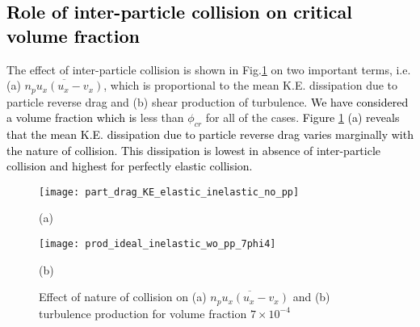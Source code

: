 \documentclass[aip,graphicx]{revtex4-1}
\begin{document}
\subsection{\textcolor{black}{Role of inter-particle collision on critical volume fraction}}
The effect of inter-particle collision is shown in Fig.{\ref{fig:eff_coll_prod_slip}} on two important terms, i.e. (a) $\overline{n_pu_x(u_x-v_x)}$, which is proportional to the mean K.E. dissipation due to particle reverse drag and (b) shear production of turbulence. \textcolor{black}{We have considered a volume fraction which is} less than $\phi_{cr}$ for all of the cases. 
\textcolor{black}{Figure {\ref{fig:eff_coll_prod_slip}} (a) reveals that the mean K.E. dissipation due to particle reverse drag varies marginally with the nature of collision. This dissipation is lowest in absence of inter-particle collision and highest for perfectly elastic collision.} 
\begin{figure}[!h]
\texttt{[image: part\_drag\_KE\_elastic\_inelastic\_no\_pp]}
\caption*{(a)}
\texttt{[image: prod\_ideal\_inelastic\_wo\_pp\_7phi4]}
\caption*{(b)}
	\caption{Effect of nature of collision on (a) $\overline{n_pu_x(u_x-v_x)}$ and (b) turbulence production for volume fraction $7\times10^{-4}$} 
	\label{fig:eff_coll_prod_slip}
\end{figure}
\end{document}

